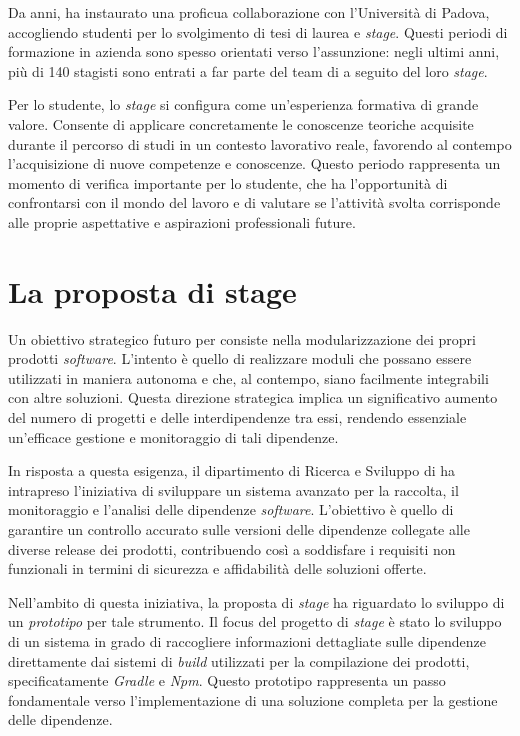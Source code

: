 \noindent Da anni, {\azienda} ha instaurato una proficua collaborazione con l'Università di Padova, accogliendo studenti per lo 
svolgimento di tesi di laurea e \textit{stage}. Questi periodi di formazione in azienda sono spesso orientati verso l'assunzione: negli 
ultimi anni, più di 140 stagisti sono entrati a far parte del team di {\azienda} a seguito del loro \textit{stage}.

Per lo studente, lo \textit{stage} si configura come un'esperienza formativa di grande valore. Consente di applicare concretamente le 
conoscenze teoriche acquisite durante il percorso di studi in un contesto lavorativo reale, favorendo al contempo l'acquisizione 
di nuove competenze e conoscenze. Questo periodo rappresenta un momento di verifica importante per lo studente, che ha l'opportunità 
di confrontarsi con il mondo del lavoro e di valutare se l'attività svolta corrisponde alle proprie aspettative e aspirazioni professionali future.


\section{La proposta di stage}

Un obiettivo strategico futuro per {\azienda} consiste nella modularizzazione dei propri prodotti \textit{software}. 
L'intento è quello di realizzare moduli che possano essere utilizzati in maniera autonoma e che, al contempo, 
siano facilmente integrabili con altre soluzioni. Questa direzione strategica implica un significativo aumento
del numero di progetti e delle interdipendenze tra essi, rendendo essenziale un'efficace gestione e monitoraggio di tali dipendenze.

In risposta a questa esigenza, il dipartimento di Ricerca e Sviluppo di {\azienda} ha intrapreso l'iniziativa 
di sviluppare un sistema avanzato per la raccolta, il monitoraggio e l'analisi delle dipendenze \textit{software}. 
L'obiettivo è quello di garantire un controllo accurato sulle versioni delle dipendenze collegate alle diverse release dei prodotti, 
contribuendo così a soddisfare i requisiti non funzionali in termini di sicurezza e affidabilità delle soluzioni offerte.

Nell'ambito di questa iniziativa, la proposta di \textit{stage} ha riguardato lo sviluppo di un \textit{\gls{prototipo}} per tale strumento. 
Il focus del progetto di \textit{stage} è stato lo sviluppo di un sistema in grado di raccogliere informazioni dettagliate sulle dipendenze 
direttamente dai sistemi di \textit{build} utilizzati per la compilazione dei prodotti, specificatamente \textit{\gls{Gradle}} e \textit{\gls{Npm}}. 
Questo prototipo rappresenta un passo fondamentale verso l'implementazione di una soluzione completa per la gestione delle dipendenze.

